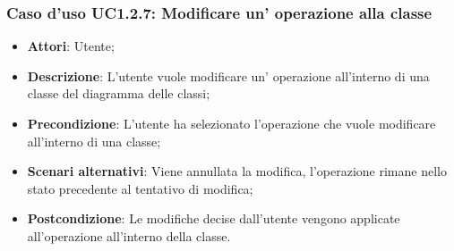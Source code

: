 \documentclass[a4paper]{report}
\begin{document}
\subsubsection{Caso d'uso UC1.2.7: Modificare un' operazione alla classe}
\begin{itemize}
	\item \textbf{Attori}: Utente;
	
	\item \textbf{Descrizione}: L'utente vuole modificare un' operazione all'interno di una classe del diagramma delle classi;
	
	\item \textbf{Precondizione}: L'utente ha selezionato l'operazione che vuole modificare all'interno di una classe;
	
	\item \textbf{Scenari alternativi}: Viene annullata la modifica, l'operazione 
	rimane nello stato precedente al tentativo di modifica;
	
	\item \textbf{Postcondizione}: Le modifiche decise dall'utente vengono applicate all'operazione all'interno della classe.
\end{itemize}
\end{document}
